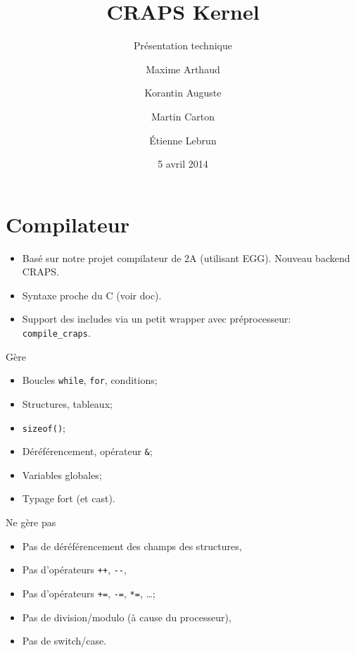 \documentclass{beamer}
\title{CRAPS Kernel}
\subtitle{Présentation technique}
\author{
       Maxime Arthaud
  \and Korantin Auguste
  \and Martin Carton
  \and Étienne Lebrun
}
\date{5 avril 2014}
\begin{document}
  \begin{frame}
    \titlepage%
  \end{frame}

  \section{Compilateur}
    \begin{frame}[fragile]
      \begin{itemize}
        \item Basé sur notre projet compilateur de 2A (utilisant EGG). Nouveau
          backend CRAPS.
        \item Syntaxe proche du C (voir doc).
        \item Support des includes via un petit wrapper avec préprocesseur:
          \verb+compile_craps+.
      \end{itemize}
\end{frame}

    \begin{frame}[fragile]{Gère}
      \begin{itemize}
        \item Boucles \verb+while+, \verb+for+, conditions;
        \item Structures, tableaux;
        \item \verb+sizeof()+;
        \item Déréférencement, opérateur \verb+&+;
        \item Variables globales;
        \item Typage fort (et cast).
      \end{itemize}
\end{frame}

    \begin{frame}[fragile]{Ne gère pas}
      \begin{itemize}
        \item Pas de déréférencement des champs des structures,
        \item Pas d'opérateurs \verb|++|, \verb|--|,
        \item Pas d'opérateurs \verb|+=|, \verb|-=|, \verb|*=|, \dots;
        \item Pas de division/modulo (à cause du processeur),
        \item Pas de switch/case.
      \end{itemize}
\end{frame}
\end{document}
